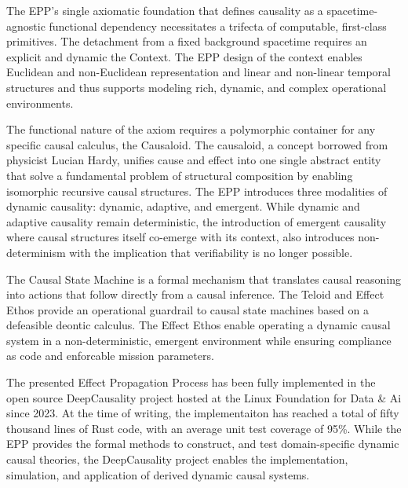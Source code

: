 The EPP's single axiomatic foundation that defines causality as a spacetime-agnostic functional dependency necessitates a trifecta of computable, first-class primitives. The detachment from a fixed background spacetime requires an explicit and dynamic the Context. The EPP design of the context enables Euclidean and non-Euclidean representation and linear and non-linear temporal structures and thus supports modeling rich, dynamic, and complex operational environments.

The functional nature of the axiom requires a polymorphic container for any specific causal calculus, the Causaloid. The causaloid, a concept borrowed from physicist Lucian Hardy, unifies cause and effect into one single abstract entity that solve a fundamental problem of structural composition by enabling isomorphic recursive causal structures. The EPP introduces three modalities of dynamic causality: dynamic, adaptive, and emergent. While dynamic and adaptive causality remain deterministic, the introduction of emergent causality where causal structures itself co-emerge with its context, also introduces non-determinism with the implication that verifiability is no longer possible.

The Causal State Machine is a formal mechanism that translates causal reasoning into actions that follow directly from a causal inference. The Teloid and Effect Ethos provide an operational guardrail to causal state machines based on a defeasible deontic calculus. The Effect Ethos enable operating a dynamic causal system in a non-deterministic, emergent environment while ensuring compliance as code and enforcable mission parameters. 

The presented Effect Propagation Process has been fully implemented in the open source DeepCausality project hosted at the Linux Foundation for Data \& Ai since 2023. At the time of writing, the implementaiton has reached a total of fifty thousand lines of Rust code, with an average unit test coverage of 95\%. While the EPP provides the formal methods to construct, and test domain-specific dynamic causal theories, the DeepCausality project enables the implementation, simulation, and application of derived dynamic causal systems.   

